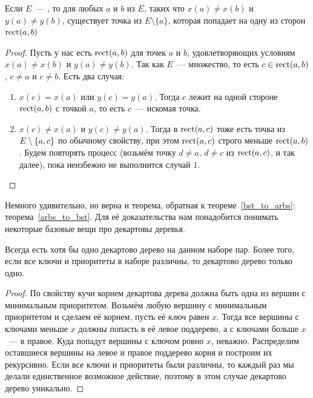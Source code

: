 \begin{lemma}\label{strong_arbs} Если $E$~--- \arbs, то для любых $a$ и $b$ из $E$, таких что $x(a) \neq x(b)$ и $y(a) \neq y(b)$, существует точка из $E \setminus \{a \}$, которая попадает на одну из сторон
	$\operatorname{rect}(a, b)$
\end{lemma}
\begin{proof} Пусть у нас есть $\operatorname{rect}(a, b)$ для точек $a$ и $b$, удовлетворяющих
	условиям $x(a) \neq x(b)$ и $y(a) \neq y(b)$. Так как $E$~--- \arbs множество, то есть
	$c \in \operatorname{rect}(a, b)$, $c \neq a$ и $c \neq b$. Есть два случая:
	\begin{enumerate}
		\item $x(c) = x(a)$ или $y(c) = y(a)$. Тогда $c$ лежит на одной стороне $\operatorname{rect}(a, b)$
		      с точкой $a$, то есть $c$~--- искомая точка.
		\item $x(c) \neq x(a)$ и $y(c) \neq y(a)$. Тогда в $\operatorname{rect}(a, c)$ тоже есть точка из $E \setminus \lbrace a, c\rbrace$ по обычному \arbs свойству, при этом $\operatorname{rect}(a, c)$ строго меньше
		      $\operatorname{rect}(a, b)$. Будем повторять процесс (возьмём точку $d \neq a$, $d \neq c$ из $\operatorname{rect}(a, c)$,
		      и так далее), пока неизбежно не выполнится случай $1$.
	\end{enumerate}
\end{proof}

Немного удивительно, но верна и теорема, обратная к теореме~\ref{bst_to_arbs}:
теорема~\ref{arbs_to_bst}. Для её доказательства нам понадобится понимать
некоторые базовые вещи про декартовы деревья.



\begin{lemma} Всегда есть хотя бы одно декартово дерево на данном наборе пар.
	Более того, если все ключи и приоритеты в наборе различны, то
	декартово дерево только одно.
\end{lemma}
\begin{proof} По свойству кучи корнем декартова дерева должна быть одна из вершин с минимальным приоритетом. Возьмём любую вершину с минимальным приоритетом и сделаем её корнем, пусть её \emph{ключ} равен $x$. Тогда все вершины с ключами меньше $x$ должны попасть в её левое поддерево, а с ключами больше $x$~--- в правое. Куда попадут вершины с ключом ровно $x$, неважно. Распределим оставшиеся вершины на левое и правое поддерево корня и построим их рекурсивно. Если все ключи и приоритеты были различны, то каждый раз мы делали единственное возможное действие, поэтому в этом случае декартово дерево уникально.
\end{proof}

